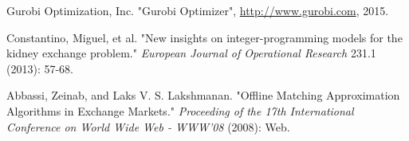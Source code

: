\documentclass[paper=a4, fontsize=11pt]{scrartcl}
\begin{document}
\newpage

\begin{thebibliography}{9}

    Gurobi Optimization, Inc.
    "Gurobi Optimizer",
    \url{http://www.gurobi.com},
    2015.

    Constantino, Miguel, et al.
    "New insights on integer-programming models for the kidney exchange problem."
    \emph{European Journal of Operational Research}
    231.1 (2013): 57-68.

    Abbassi, Zeinab, and Laks V. S. Lakshmanan.
    "Offline Matching Approximation Algorithms in Exchange Markets."
    \emph{Proceeding of the 17th International Conference on World Wide Web - WWW'08}
    (2008): Web.

\end{thebibliography}
\end{document}
